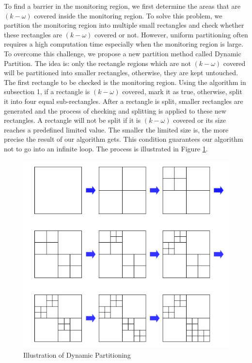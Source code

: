 To find a barrier in the monitoring region, we first determine the areas that are $(k-\omega)$ covered inside the monitoring region. To solve this problem, we partition the monitoring region into multiple small rectangles and check whether these rectangles are $(k-\omega)$ covered or not. However, uniform partitioning often requires a high computation time especially when the monitoring region is large. To overcome this challenge, we propose a new partition method called Dynamic Partition. The idea is: only the rectangle regions which are not $(k-\omega)$ covered will be partitioned into smaller rectangles, otherwise, they are kept untouched. \\
The first rectangle to be checked is the monitoring region. 
Using the algorithm in subsection 1, if a rectangle is $(k-\omega)$ covered, mark it as true, otherwise, split it into four equal sub-rectangles. After a rectangle is split, smaller rectangles are generated and the process of checking and splitting is applied to these new rectangles. A rectangle will not be split if it is $(k-\omega)$ covered or its size reaches a predefined limited value. The smaller the limited size is, the more precise the result of our algorithm gets. This condition guarantees our algorithm not to go into an infinite loop. The process is illustrated in Figure \ref{dynamic}.
%
\begin{figure}[h]
	\begin{center}
		\includegraphics[scale=1.]{Dynamic_Partition.pdf}
	\end{center}
	\caption{Illustration of Dynamic Partitioning}
	\label{dynamic}
\end{figure}

